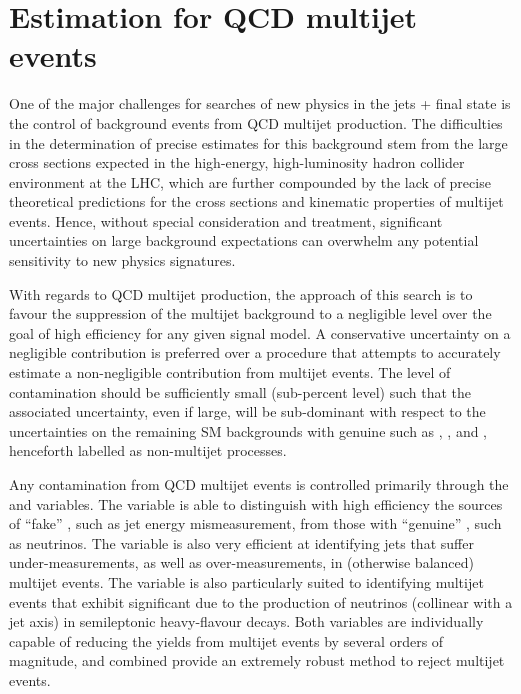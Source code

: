 
\def\rmhtmet{\mbox{$\mathcal{R}$}\xspace}

\section{Estimation for QCD multijet events \label{sec:qcd}}

One of the major challenges for searches of new physics in the jets +
\met final state is the control of background events from QCD multijet
production. The difficulties in the determination of precise estimates
for this background stem from the large cross sections expected in the
high-energy, high-luminosity hadron collider environment at the LHC,
which are further compounded by the lack of precise theoretical
predictions for the cross sections and kinematic properties of
multijet events. Hence, without special consideration and treatment,
significant uncertainties on large background expectations can
overwhelm any potential sensitivity to new physics signatures.

With regards to QCD multijet production, the approach of this search
is to favour the suppression of the multijet background to a
negligible level over the goal of high efficiency for any given signal
model. A conservative uncertainty on a negligible contribution is
preferred over a procedure that attempts to accurately estimate a
non-negligible contribution from multijet events. The level of
contamination should be sufficiently small (\ie sub-percent level)
such that the associated uncertainty, even if large, will be
sub-dominant with respect to the uncertainties on the remaining SM
backgrounds with genuine \met such as \wj, \znunu, and \ttbar,
henceforth labelled as non-multijet processes.

Any contamination from QCD multijet events is controlled primarily
through the \alphat and \bdphi variables. The \alphat variable is able
to distinguish with high efficiency the sources of ``fake'' \met, such
as jet energy mismeasurement, from those with ``genuine'' \met, such
as neutrinos. The \bdphi variable is also very efficient at
identifying jets that suffer under-measurements, as well as
over-measurements, in (otherwise balanced) multijet events. The
variable is also particularly suited to identifying multijet events
that exhibit significant \met due to the production of neutrinos
(collinear with a jet axis) in semileptonic heavy-flavour decays. Both
variables are individually capable of reducing the yields from
multijet events by several orders of magnitude, and combined provide
an extremely robust method to reject multijet events.

